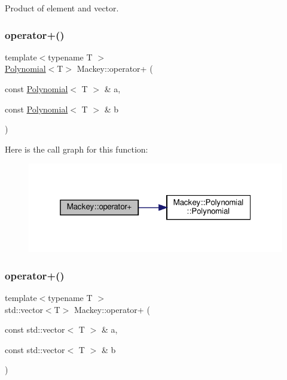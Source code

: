 Product of element and vector. 

\mbox{\label{namespaceMackey_a61f8cf9c3cf22acfedda5f427423f6c4}} 
\subsubsection{\texorpdfstring{operator+()}{operator+()}\hspace{0.1cm}{\footnotesize\ttfamily [1/3]}}
{\footnotesize\ttfamily template$<$typename T $>$ \\
\hyperlink{classMackey_1_1Polynomial}{Polynomial}$<$T$>$ Mackey\+::operator+ (\begin{DoxyParamCaption}\item[{const \hyperlink{classMackey_1_1Polynomial}{Polynomial}$<$ T $>$ \&}]{a,  }\item[{const \hyperlink{classMackey_1_1Polynomial}{Polynomial}$<$ T $>$ \&}]{b }\end{DoxyParamCaption})}

Here is the call graph for this function\+:\nopagebreak
\begin{figure}[H]
\begin{center}
\leavevmode
\includegraphics[width=319pt]{namespaceMackey_a61f8cf9c3cf22acfedda5f427423f6c4_cgraph}
\end{center}
\end{figure}
\mbox{\label{namespaceMackey_adb4974b5ffe533abb955ccb6b9096155}} 
\subsubsection{\texorpdfstring{operator+()}{operator+()}\hspace{0.1cm}{\footnotesize\ttfamily [2/3]}}
{\footnotesize\ttfamily template$<$typename T $>$ \\
std\+::vector$<$T$>$ Mackey\+::operator+ (\begin{DoxyParamCaption}\item[{const std\+::vector$<$ T $>$ \&}]{a,  }\item[{const std\+::vector$<$ T $>$ \&}]{b }\end{DoxyParamCaption})}




